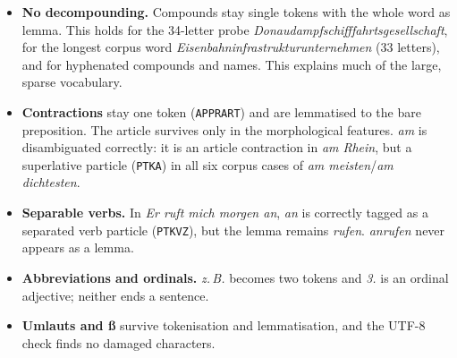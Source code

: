 \documentclass[11pt,a4paper]{article}
\newcommand{\code}[1]{\texttt{#1}}
\newcommand{\de}[1]{\textit{#1}}
\begin{document}
\begin{table}[h]\centering\footnotesize
\caption{Probe inputs: compounds, contractions, ß, hyphenation, separable verb, abbreviations.}\label{tab:probes}

\end{table}

\begin{table}[h]\centering\small
\begin{minipage}[t]{0.46\linewidth}\centering
\caption{Longest corpus words.}
\resizebox{\linewidth}{!}{}
\end{minipage}\hfill
\begin{minipage}[t]{0.5\linewidth}\centering
\caption{Contractions in the corpus.}
\resizebox{\linewidth}{!}{}
\end{minipage}
\end{table}

\begin{itemize}
  \item \textbf{No decompounding.} Compounds stay single tokens with the whole word as lemma. This holds for the 34-letter probe \de{Donaudampfschifffahrtsgesellschaft}, for the longest corpus word \de{Eisenbahninfrastrukturunternehmen} (33 letters), and for hyphenated compounds and names. This explains much of the large, sparse vocabulary.
  \item \textbf{Contractions} stay one token (\code{APPRART}) and are lemmatised to the bare preposition. The article survives only in the morphological features. \de{am} is disambiguated correctly: it is an article contraction in \de{am Rhein}, but a superlative particle (\code{PTKA}) in all six corpus cases of \de{am meisten}/\de{am dichtesten}.
  \item \textbf{Separable verbs.} In \de{Er ruft mich morgen an}, \de{an} is correctly tagged as a separated verb particle (\code{PTKVZ}), but the lemma remains \de{rufen}. \de{anrufen} never appears as a lemma.
  \item \textbf{Abbreviations and ordinals.} \de{z.\,B.} becomes two tokens and \de{3.} is an ordinal adjective; neither ends a sentence.
  \item \textbf{Umlauts and ß} survive tokenisation and lemmatisation, and the UTF-8 check finds no damaged characters.
\end{itemize}

\begin{table}[h]\centering\small
\caption{Our row of the class comparison table.}\label{tab:row}

\end{table}
\end{document}
